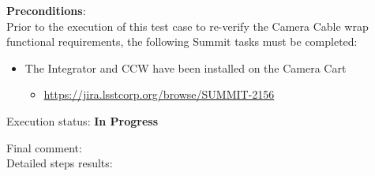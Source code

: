 \documentclass[SE,lsstdraft,STR,toc]{lsstdoc}
\providecommand{\tightlist}{
  \setlength{\itemsep}{0pt}\setlength{\parskip}{0pt}}
\begin{document}
\textbf{ Preconditions}:\\
 Prior to the execution of this test case to re-verify the Camera Cable
wrap functional requirements, the following Summit tasks must be
completed:

\begin{itemize}
\tightlist
\item
  The Integrator and CCW have been installed on the Camera Cart

  \begin{itemize}
  \tightlist
  \item
    \url{https://jira.lsstcorp.org/browse/SUMMIT-2156}
  \end{itemize}
\end{itemize}


Execution status: {\bf In Progress }

Final comment:\\


Detailed steps results:
\end{document}
